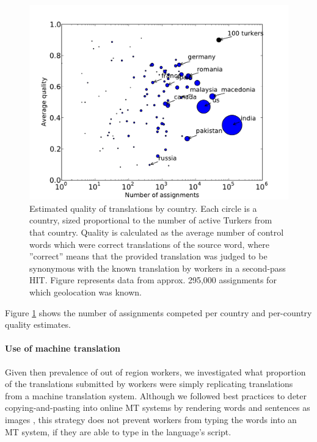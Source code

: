 \documentclass[11pt]{article}
\begin{document}
\begin{figure}[h]
\begin{center}
\includegraphics[width=.8\linewidth]{final-figures/quality-scatter}
\end{center}

\caption{Estimated quality of translations by country. Each circle is a country, sized proportional to the number of active Turkers from that country. Quality is calculated as the average number of control words which were correct translations of the source word, where ”correct” means that the provided translation was judged to be synonymous with the known translation by workers in a second-pass HIT. Figure represents data from approx. 295,000 assignments for which geolocation was known.}
\label{quality-scatter}
\end{figure}

Figure \ref{quality-scatter} shows the number of assignments competed per country and per-country quality estimates.

\paragraph{Use of machine translation}


Given then prevalence of out of region workers, we investigated what proportion of the translations submitted by workers were simply replicating translations from a machine translation system.  Although we followed best practices to deter copying-and-pasting into online MT systems  by  rendering words and sentences as images \cite{zaidan-callisonburch:2011:ACL-HLT2011a}, this strategy does not prevent workers from typing the words into an MT system, if they are able to type in the language's script. 
\end{document}
